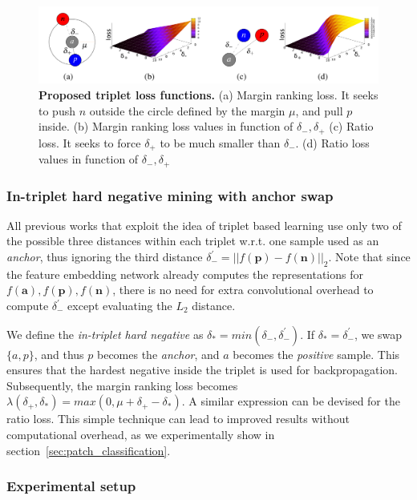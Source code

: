 \begin{figure}[t]
    \centering
    \includegraphics[width=\linewidth]{main/chapter02/images/tfeat_losses.png}
    \caption[Proposed triplet loss functions]{\textbf{Proposed triplet loss functions.} (a) Margin ranking loss. It seeks to push $n$ outside
  the circle defined by the margin $\mu$, and pull $p$ inside. (b)
  Margin ranking loss values in function of $\delta_{-},\delta_{+}$
  (c) Ratio loss. It seeks to force
  $\delta_{+}$ to be much smaller than $\delta_{-}$. (d)
  Ratio loss values in function of $\delta_{-},\delta_{+}$}
\label{fig:losses}
\end{figure}  


\subsubsection{In-triplet hard negative mining with anchor swap}

All previous works that exploit the idea of triplet based learning use only two of
the possible three distances within each triplet w.r.t. one
sample  used as an \textit{anchor}, thus ignoring the
third distance 
$\delta_{-}^{'} = ||f(\boldsymbol p)-f(\boldsymbol n)||_2.$ Note that
since the feature embedding network already computes the
representations for
$f(\boldsymbol a), f(\boldsymbol p), f(\boldsymbol n) $, there is no
need for extra convolutional overhead to compute
$\delta_{-}^{'}$ except
evaluating the $L_2$ distance.

We define the \textit{in-triplet hard negative} as
$\delta_{*} = min(\delta_{-},\delta_{-}^{'})$. If
$\delta_{*} = \delta_{-}^{'}$, we swap $\{a,p\}$, and thus $p$ becomes
the \textit{anchor}, and $a$ becomes the \textit{positive}
sample. This ensures that the hardest negative inside the triplet 
is used for backpropagation. Subsequently, the margin ranking loss
becomes $\lambda(\delta_+,\delta_*) = max(0, \mu
+\delta_+-\delta_*)$. A similar expression can be devised for the
ratio loss.  This simple technique can lead to improved
results without  computational overhead, as we experimentally show in section~\ref{sec:patch_classification}. 

\subsubsection{Experimental setup}

